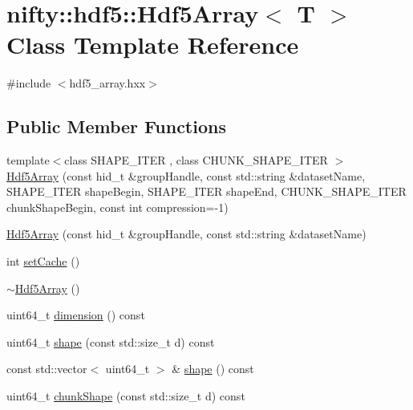 \hypertarget{classnifty_1_1hdf5_1_1Hdf5Array}{}\section{nifty\+:\+:hdf5\+:\+:Hdf5\+Array$<$ T $>$ Class Template Reference}
\label{classnifty_1_1hdf5_1_1Hdf5Array}


{\ttfamily \#include $<$hdf5\+\_\+array.\+hxx$>$}

\subsection*{Public Member Functions}
\begin{DoxyCompactItemize}
\item 
{\footnotesize template$<$class S\+H\+A\+P\+E\+\_\+\+I\+T\+E\+R , class C\+H\+U\+N\+K\+\_\+\+S\+H\+A\+P\+E\+\_\+\+I\+T\+E\+R $>$ }\\\hyperlink{classnifty_1_1hdf5_1_1Hdf5Array_af164b10a52ab55e3f5a72004b6f6e278}{Hdf5\+Array} (const hid\+\_\+t \&group\+Handle, const std\+::string \&dataset\+Name, S\+H\+A\+P\+E\+\_\+\+I\+T\+E\+R shape\+Begin, S\+H\+A\+P\+E\+\_\+\+I\+T\+E\+R shape\+End, C\+H\+U\+N\+K\+\_\+\+S\+H\+A\+P\+E\+\_\+\+I\+T\+E\+R chunk\+Shape\+Begin, const int compression=-\/1)
\item 
\hyperlink{classnifty_1_1hdf5_1_1Hdf5Array_a8ce039a0d357f3c20a30fa5f6d595cb5}{Hdf5\+Array} (const hid\+\_\+t \&group\+Handle, const std\+::string \&dataset\+Name)
\item 
int \hyperlink{classnifty_1_1hdf5_1_1Hdf5Array_a59e94ddc29dd4ba7e85a11c68960ea77}{set\+Cache} ()
\item 
\hyperlink{classnifty_1_1hdf5_1_1Hdf5Array_a6f02962174e64b4c893b287f735cd30d}{$\sim$\+Hdf5\+Array} ()
\item 
uint64\+\_\+t \hyperlink{classnifty_1_1hdf5_1_1Hdf5Array_a31ff7ce3b1524babd925a2013c590665}{dimension} () const 
\item 
uint64\+\_\+t \hyperlink{classnifty_1_1hdf5_1_1Hdf5Array_a6b118d13cc01f9adf6548115474b64ff}{shape} (const std\+::size\+\_\+t d) const 
\item 
const std\+::vector$<$ uint64\+\_\+t $>$ \& \hyperlink{classnifty_1_1hdf5_1_1Hdf5Array_af749bd9be409404fb41fa614dcdd3c45}{shape} () const 
\item 
uint64\+\_\+t \hyperlink{classnifty_1_1hdf5_1_1Hdf5Array_ade286b273c05f5ce3b3e0b5df3836d00}{chunk\+Shape} (const std\+::size\+\_\+t d) const 

\end{DoxyCompactItemize}
